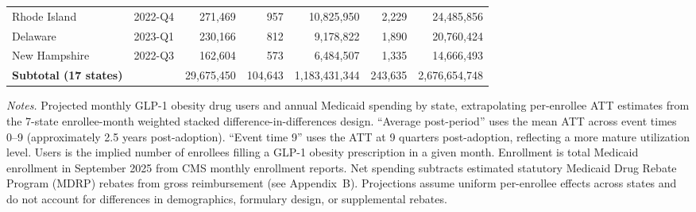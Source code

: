 \begin{landscape}
\begin{table}[!htbp]
\begin{tabular}{@{} l l r rr rr @{}}
  Rhode Island & 2022-Q4 & 271,469 & 957 & 10,825,950 & 2,229 & 24,485,856 \\
  Delaware & 2023-Q1 & 230,166 & 812 & 9,178,822 & 1,890 & 20,760,424 \\
  New Hampshire & 2022-Q3 & 162,604 & 573 & 6,484,507 & 1,335 & 14,666,493 \\
\midrule
  \textbf{Subtotal (17 states)} &  & 29,675,450 & 104,643 & 1,183,431,344 & 243,635 & 2,676,654,748 \\
\bottomrule
\end{tabular}
\begin{minipage}{0.95\linewidth}
\vspace{0.5em}
\footnotesize
\textit{Notes.}
Projected monthly GLP-1 obesity drug users and annual Medicaid spending by state,
extrapolating per-enrollee ATT estimates from the 7-state enrollee-month weighted stacked
difference-in-differences design.
``Average post-period'' uses the mean ATT across event times 0--9 (approximately 2.5 years post-adoption).
``Event time 9'' uses the ATT at 9 quarters post-adoption, reflecting a more mature utilization level.
Users is the implied number of enrollees filling a GLP-1 obesity prescription in a given month.
Enrollment is total Medicaid enrollment in September 2025 from CMS monthly enrollment reports.
Net spending subtracts estimated statutory Medicaid Drug Rebate Program (MDRP) rebates from gross reimbursement (see Appendix~B).
Projections assume uniform per-enrollee effects across states and do not account for differences in
demographics, formulary design, or supplemental rebates.
\end{minipage}
\end{table}
\end{landscape}

